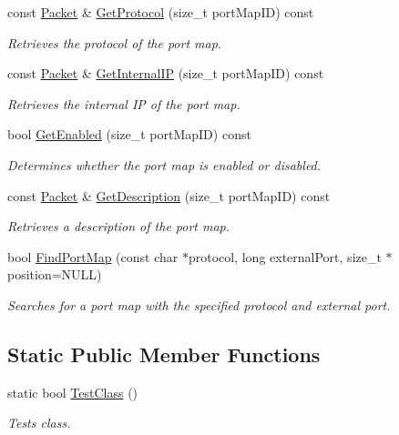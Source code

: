\begin{DoxyCompactItemize}
const \hyperlink{class_packet}{Packet} \& \hyperlink{class_upnp_nat_communication_a22c396b7787e5b1fc210333eb8af0e0d}{GetProtocol} (size\_\-t portMapID) const 
\begin{DoxyCompactList}\small\item\em Retrieves the protocol of the port map. \item\end{DoxyCompactList}\item 
const \hyperlink{class_packet}{Packet} \& \hyperlink{class_upnp_nat_communication_a47c36b09d836d8e16057186b89c6891e}{GetInternalIP} (size\_\-t portMapID) const 
\begin{DoxyCompactList}\small\item\em Retrieves the internal IP of the port map. \item\end{DoxyCompactList}\item 
bool \hyperlink{class_upnp_nat_communication_a30a5ab268869665e98fd42c5e043fa1d}{GetEnabled} (size\_\-t portMapID) const 
\begin{DoxyCompactList}\small\item\em Determines whether the port map is enabled or disabled. \item\end{DoxyCompactList}\item 
const \hyperlink{class_packet}{Packet} \& \hyperlink{class_upnp_nat_communication_aa0612037ba2f4c468fda461cae4138f7}{GetDescription} (size\_\-t portMapID) const 
\begin{DoxyCompactList}\small\item\em Retrieves a description of the port map. \item\end{DoxyCompactList}\item 
bool \hyperlink{class_upnp_nat_communication_a203f65fcf27a0034cf2505ae0228c40e}{FindPortMap} (const char $\ast$protocol, long externalPort, size\_\-t $\ast$position=NULL)
\begin{DoxyCompactList}\small\item\em Searches for a port map with the specified protocol and external port. \item\end{DoxyCompactList}\end{DoxyCompactItemize}
\subsection*{Static Public Member Functions}
\begin{DoxyCompactItemize}
\item 
static bool \hyperlink{class_upnp_nat_communication_ac5b40ecdbcfcedd7f2371e5abcb1ce26}{TestClass} ()
\begin{DoxyCompactList}\small\item\em Tests class. \item\end{DoxyCompactList}\end{DoxyCompactItemize}
